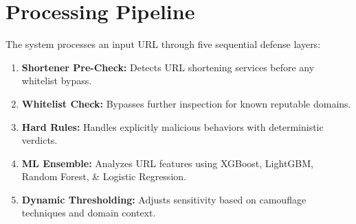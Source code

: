 \documentclass[12pt,a4paper]{article}
\begin{document}
\section{Processing Pipeline}

The system processes an input URL through five sequential defense layers:
\begin{enumerate}
    \item \textbf{Shortener Pre-Check:} Detects URL shortening services before any whitelist bypass.
    \item \textbf{Whitelist Check:} Bypasses further inspection for known reputable domains.
    \item \textbf{Hard Rules:} Handles explicitly malicious behaviors with deterministic verdicts.
    \item \textbf{ML Ensemble:} Analyzes URL features using XGBoost, LightGBM, Random Forest, \& Logistic Regression.
    \item \textbf{Dynamic Thresholding:} Adjusts sensitivity based on camouflage techniques and domain context.
\end{enumerate}
\end{document}

